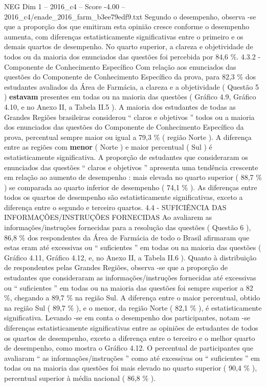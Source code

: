 \begin{textsample}{NEG Dim 1 – 2016\_c4 – Score -4.00 – 2016\_c4/enade\_2016\_farm\_b3ee79edf9.txt}
Segundo o desempenho, observa -se que a proporção dos que emitiram esta opinião cresce conforme o desempenho aumenta, com diferenças estatisticamente significativas entre o primeiro e os demais quartos de desempenho.
No quarto superior, a clareza e objetividade de todos ou da maioria dos enunciados das questões foi percebida por 84,6 \%. 4.3.2 - Componente de Conhecimento Específico Com relação aos enunciados das questões do Componente de Conhecimento Específico da prova, para 82,3 \% dos estudantes avaliados da Área de Farmácia, a clareza e a objetividade ( Questão 5 ) \textbf{estavam} presentes em todas ou na maioria das questões ( Gráfico 4.9, Gráfico 4.10, e no Anexo II, a Tabela II.5 ).
A maioria dos estudantes de todas as Grandes Regiões brasileiras considerou “ claros e objetivos ” todos ou a maioria dos enunciados das questões do Componente de Conhecimento Específico da prova, percentual sempre maior ou igual a 79,3 \% ( região Norte ).
A diferença entre as regiões com \textbf{menor} ( Norte ) e maior percentual ( Sul ) é estatisticamente significativa.
A proporção de estudantes que consideraram os enunciados das questões “ claros e objetivos ” apresenta uma tendência crescente em relação ao aumento de desempenho : mais elevada no quarto superior ( 88,7 \% ) se comparada ao quarto inferior de desempenho ( 74,1 \% ).
As diferenças entre todos os quartos de desempenho são estatisticamente significativas, exceto a diferença entre o segundo e terceiro quartos. 4.4 - SUFICIÊNCIA DAS INFORMAÇÕES/INSTRUÇÕES FORNECIDAS Ao avaliarem as informações/instruções fornecidas para a resolução das questões ( Questão 6 ), 86,8 \% dos respondentes da Área de Farmácia de todo o Brasil afirmaram que estas eram até excessivas ou “ suficientes ” em todas ou na maioria das questões ( Gráfico 4.11, Gráfico 4.12, e, no Anexo II, a Tabela II.6 ).
Quanto à distribuição de respondentes pelas Grandes Regiões, observa -se que a proporção de estudantes que consideraram as informações/instruções fornecidas até excessivas ou “ suficientes ” em todas ou na maioria das questões foi sempre superior a 82 \%, chegando a 89,7 \% na região Sul.
A diferença entre o maior percentual, obtido na região Sul ( 89,7 \% ), e o menor, da região Norte ( 82,1 \% ), é estatisticamente significativa.
Levando -se em conta o desempenho dos participantes, notam -se diferenças estatisticamente significativas entre as opiniões de estudantes de todos os quartos de desempenho, exceto a diferença entre o terceiro e o melhor quarto de desempenho, como mostra o Gráfico 4.12.
O percentual de participantes que avaliaram “ as informações/instruções ” como até excessivas ou “ suficientes ” em todas ou na maioria das questões foi mais elevado no quarto superior ( 90,4 \% ), percentual superior à média nacional ( 86,8 \% ).

\end{textsample}
